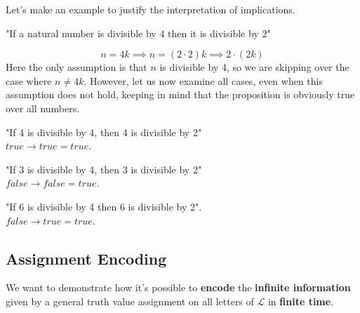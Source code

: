 		\begin{example} Let's make an example to justify the interpretation of implications.
		\begin{center}
		  "If a natural number is divisible by $4$ then it is divisible by $2$"
		\end{center}
		$$ n = 4k \implies n = (2 \cdot 2) k \implies 2 \cdot (2k) $$
		Here the only assumption is that $n$ is divisible by 4, so we are skipping over the case where $n \neq 4k$. However, let us now examine all cases, even when this assumption does not hold, keeping in mind  that the proposition is obviously true over all numbers.

		\begin{center}
		"If 4 is divisible by 4, then 4 is divisible by 2"\\
		$true \rightarrow true = true$.
	  \end{center}

	  \begin{center}
		"If 3 is divisible by 4, then 3 is divisible by 2"\\
		$false \rightarrow false = true$.
	  \end{center}

	  \begin{center}
		"If 6 is divisible by 4 then 6 is divisible by 2". \\
		$false \rightarrow true = true$.
	  \end{center}
	\end{example}

	\subsection{Assignment Encoding}

	We want to demonstrate how it's possible to \textbf{encode} the \textbf{infinite information} given by a general truth value assignment on all letters of $\mathcal{L}$ in \textbf{finite time}.

